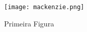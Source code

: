 \begin{figure}[h]
    \centering
    \texttt{[image: mackenzie.png]}
    \caption{Primeira Figura}
    \label{fig:mesh1}
\end{figure}